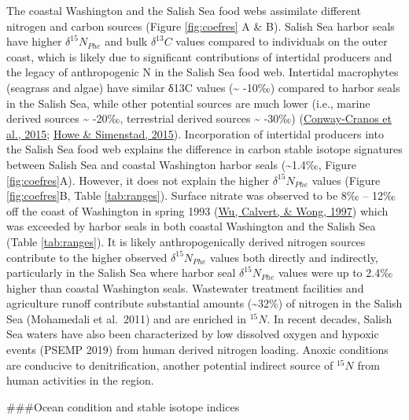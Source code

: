 \documentclass [11pt, proquest] {uwthesis}[2015/03/03]
\begin{document}
The coastal Washington and the Salish Sea food webs assimilate different nitrogen and carbon sources (Figure \ref{fig:coefres} A \& B). Salish Sea harbor seals have higher \(\delta^{15}N_{Phe}\) and bulk \(\delta^{13}C\) values compared to individuals on the outer coast, which is likely due to significant contributions of intertidal producers and the legacy of anthropogenic N in the Salish Sea food web. Intertidal macrophytes (seagrass and algae) have similar δ13C values (\textasciitilde{} -10‰) compared to harbor seals in the Salish Sea, while other potential sources are much lower (i.e., marine derived sources \textasciitilde{} -20‰, terrestrial derived sources \textasciitilde{} -30‰) (\protect\hyperlink{ref-Conway2015}{Conway-Cranos et al., 2015}; \protect\hyperlink{ref-Howe2015}{Howe \& Simenstad, 2015}). Incorporation of intertidal producers into the Salish Sea food web explains the difference in carbon stable isotope signatures between Salish Sea and coastal Washington harbor seals (\textasciitilde1.4‰, Figure \ref{fig:coefres}A). However, it does not explain the higher \(\delta^{15}N_{Phe}\) values (Figure \ref{fig:coefres}B, Table \ref{tab:ranges}). Surface nitrate was observed to be 8‰ -- 12‰ off the coast of Washington in spring 1993 (\protect\hyperlink{ref-Wu1997}{Wu, Calvert, \& Wong, 1997}) which was exceeded by harbor seals in both coastal Washington and the Salish Sea (Table \ref{tab:ranges}). It is likely anthropogenically derived nitrogen sources contribute to the higher observed \(\delta^{15}N_{Phe}\) values both directly and indirectly, particularly in the Salish Sea where harbor seal \(\delta^{15}N_{Phe}\) values were up to 2.4‰ higher than coastal Washington seals. Wastewater treatment facilities and agriculture runoff contribute substantial amounts (\textasciitilde32\%) of nitrogen in the Salish Sea (Mohamedali et al.~2011) and are enriched in \(^{15}N\). In recent decades, Salish Sea waters have also been characterized by low dissolved oxygen and hypoxic events (PSEMP 2019) from human derived nitrogen loading. Anoxic conditions are conducive to denitrification, another potential indirect source of \(^{15}N\) from human activities in the region.

\#\#\#Ocean condition and stable isotope indices
\end{document}
